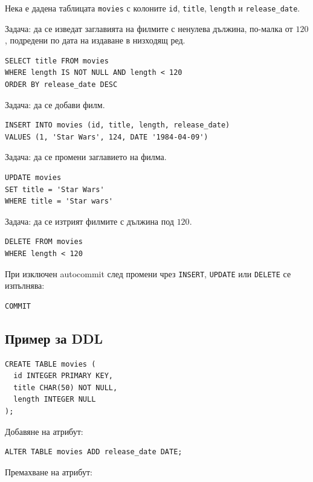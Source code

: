 Нека е дадена таблицата \texttt{movies} с колоните \texttt{id}, \texttt{title}, \texttt{length} и \texttt{release\_date}.

Задача: да се изведат заглавията на филмите с ненулева дължина, по-малка от $120$, подредени по дата на издаване в низходящ ред.

\begin{verbatim}
SELECT title FROM movies
WHERE length IS NOT NULL AND length < 120
ORDER BY release_date DESC
\end{verbatim}

Задача: да се добави филм.

\begin{verbatim}
INSERT INTO movies (id, title, length, release_date)
VALUES (1, 'Star Wars', 124, DATE '1984-04-09')
\end{verbatim}

Задача: да се промени заглавието на филма.

\begin{verbatim}
UPDATE movies
SET title = 'Star Wars'
WHERE title = 'Star wars'
\end{verbatim}

Задача: да се изтрият филмите с дължина под $120$.

\begin{verbatim}
DELETE FROM movies
WHERE length < 120
\end{verbatim}

При изключен autocommit след промени чрез \texttt{INSERT}, \texttt{UPDATE} или \texttt{DELETE} се изпълнява:

\begin{verbatim}
COMMIT
\end{verbatim}

\subsection{Пример за DDL}\label{s:23.5.2}

\begin{verbatim}
CREATE TABLE movies (
  id INTEGER PRIMARY KEY,
  title CHAR(50) NOT NULL,
  length INTEGER NULL
);
\end{verbatim}

Добавяне на атрибут:

\begin{verbatim}
ALTER TABLE movies ADD release_date DATE;
\end{verbatim}

Премахване на атрибут:

